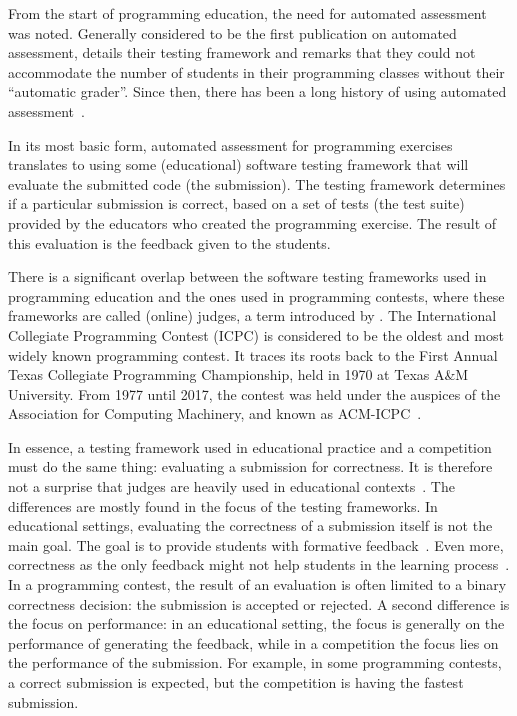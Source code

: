 \documentclass[../main]{subfiles}
\begin{document}
From the start of programming education, the need for automated assessment was noted.
Generally considered to be the first publication on automated assessment, \textcite{hollingsworthAutomaticGradersProgramming1960} details their testing framework and remarks that they could not accommodate the number of students in their programming classes without their ``automatic grader''.
Since then, there has been a long history of using automated assessment~\autocite{ala-mutkaSurveyAutomatedAssessment2005,douceAutomaticTestbasedAssessment2005,ihantolaReviewRecentSystems2010,paivaAutomatedAssessmentComputer2022,combefisAutomatedCodeAssessment2022,nayakAutomatedAssessmentTools2022,messerAutomatedGradingFeedback2024}.

In its most basic form, automated assessment for programming exercises translates to using some (educational) software testing framework that will evaluate the submitted code (the submission).
The testing framework determines if a particular submission is correct, based on a set of tests (the test suite) provided by the educators who created the programming exercise.
The result of this evaluation is the feedback given to the students.

There is a significant overlap between the software testing frameworks used in programming education and the ones used in programming contests, where these frameworks are called (online) judges, a term introduced by \textcite{kurniaOnlineJudge2001}.
The International Collegiate Programming Contest (ICPC) is considered to be the oldest and most widely known programming contest.
It traces its roots back to the First Annual Texas Collegiate Programming Championship, held in 1970 at Texas A\&M University.
From 1977 until 2017, the contest was held under the auspices of the Association for Computing Machinery, and known as ACM-ICPC~\autocite{ICPCFactSheet2023}.

In essence, a testing framework used in educational practice and a competition must do the same thing: evaluating a submission for correctness.
It is therefore not a surprise that judges are heavily used in educational contexts~\autocite{wasikSurveyOnlineJudge2018,zinovievaUseOnlineCoding2021,liuWhoJudgesJudge2023}.
The differences are mostly found in the focus of the testing frameworks.
In educational settings, evaluating the correctness of a submission itself is not the main goal.
The goal is to provide students with formative feedback~\autocite{caizaProgrammingAssignmentsAutomatic2013,cavalcantiAutomaticFeedbackOnline2021}.
Even more, correctness as the only feedback might not help students in the learning process~\autocite{haoUnderstandingEffectiveDesign2021}.
In a programming contest, the result of an evaluation is often limited to a binary correctness decision: the submission is accepted or rejected.
A second difference is the focus on performance: in an educational setting, the focus is generally on the performance of generating the feedback, while in a competition the focus lies on the performance of the submission.
For example, in some programming contests, a correct submission is expected, but the competition is having the fastest submission.
\end{document}
